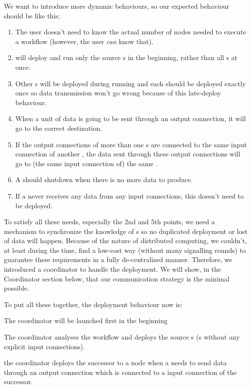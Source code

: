 We want to introduce more dynamic behaviours, so our expected behaviour should be like this:
\begin{enumerate}
	\item The user doesn't need to know the actual number of nodes needed to execute a workflow (however, the user \emph{can} know that).
	\item \Dpy will deploy and run only the source \tPEInst{}s in the beginning, rather than all \tPEInst{}s at once.
	\item Other \tPEInst{}s will be deployed during running and each \tPEInst should be deployed exactly once so data transmission won't go wrong because of this late-deploy behaviour.
	\item When a unit of data is going to be sent through an output connection, it will go to the correct destination.
	\item If the output connections of more than one \tPEInst{}s are connected to the same input connection of another \tPEInst, the data sent through these output connections will go to (the same input connection of) the same \tPEInst.
	\item A \tPEInst should shutdown when there is no more data to produce.
	\item If a \tPEInst never receives any data from any input connections, this \tPEInst doesn't need to be deployed.
\end{enumerate}

To satisfy all these needs, especially the 2nd and 5th points, we need a mechanism to synchronize the knowledge of \tPEInst{}s so no duplicated deployment or lost of data will happen. Because of the nature of distributed computing, we couldn't, at least during the time, find a low-cost way (\ie without many signalling rounds) to guarantee these requirements in a fully de-centralized manner. Therefore, we introduced a coordinator to handle the deployment. We will show, in the Coordinator section below, that our communication strategy is the minimal possible.

To put all these together, the deployment behaviour now is:
\begin{enumerate*}
	\item The coordinator will be launched first in the beginning
	\item The coordinator analyses the workflow and deploys the source \tPEInst{}s (\ie \tPEInst{}s without any explicit input connections).
	\item the coordinator deploys the successor \tPEInst to a node when a \tPEInst needs to send data through an output connection which is connected to a input connection of the successor.
\end{enumerate*}


